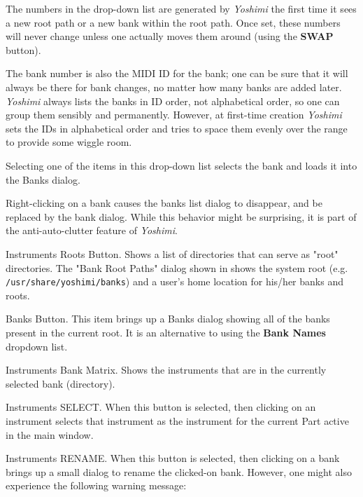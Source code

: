    The numbers in the drop-down list are generated by \textsl{Yoshimi} the
   first time it sees a new root path or a new bank within the root path.
   Once set, these numbers will never change unless one actually moves them
   around (using the \textbf{SWAP} button).

   The bank number is also the MIDI ID for the bank;
   one can be sure that it will always
   be there for bank changes, no matter how many banks are added later.
   \textsl{Yoshimi} always lists the banks in ID order, not alphabetical
   order, so one can group them sensibly and permanently.
   However, at first-time creation \textsl{Yoshimi} sets the IDs in
   alphabetical order and tries to space them evenly over the range to
   provide some wiggle room.                                        

   Selecting one of the items in this drop-down list selects the bank and
   loads it into the Banks dialog.

   Right-clicking on a bank causes the banks list dialog
   to disappear, and be replaced by the bank dialog.  While this
   behavior might be surprising, it is part of the anti-auto-clutter feature
   of \textsl{Yoshimi}.

   Instruments Roots Button.
   Shows a list of directories that can serve as "root" directories.
   The "Bank Root Paths" dialog shown in
    shows
   the system root (e.g. \texttt{/usr/share/yoshimi/banks}) and
   a user's home location for his/her banks and roots.

   Banks Button.
   This item brings up a Banks dialog showing all of the banks present in the
   current root.
   It is an alternative to using the \textbf{Bank Names} dropdown list.

   Instruments Bank Matrix.
   Shows the instruments that are in the currently selected bank
   (directory).

   Instruments SELECT.
   When this button is selected, then clicking on an instrument selects that
   instrument as the instrument for the current Part active in the main
   window.

   Instruments RENAME.
   When this button is selected, then clicking on a bank brings
   up a small dialog to rename the clicked-on bank.
   However, one might also experience the following warning message:

